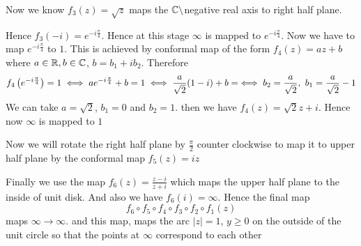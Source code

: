 \documentclass[a4paper, 11pt]{article}
\begin{document}
{\begin{center}
\end{center}
Now we know $f_3(z)=\sqrt{z}$ maps the $\mathbb{C}\setminus$negative real axis to right half plane.
\begin{center}
\end{center}
Hence $f_3(-i)=e^{-i\frac{\pi}{4}}$. Hence at this stage $\infty $ is mapped to $e^{-i\frac{\pi}{4}}$. Now we have to map $e^{-i\frac{\pi}{4}}$ to $1$. This is achieved by conformal map of the form $f_4(z)=az+b$ where $a\in\mathbb{R},b\in\mathbb{C}$, $b=b_1+ib_2$. Therefore $$f_4\left(e^{-i\frac{\pi}{4}}\right)=1\iff ae^{-i\frac{\pi}{4}}+b=1\iff \frac{a}{\sqrt{2}}(1-i)+b=\iff b_2=\frac{a}{\sqrt{2}},\ b_1=\frac{a}{\sqrt{2}}-1$$
We can take $a=\sqrt{2}$, $b_1=0$ and $b_2=1$. then we have $f_4(z)=\sqrt{2}z+i$. Hence now $\infty$ is mapped to $1$

Now we will rotate the right half plane by $\frac{\pi}{2}$ counter clockwise to map it to upper half plane by the conformal map $f_5(z)=iz$
\begin{center}
\end{center}

Finally we use the map $f_6(z)=\frac{z-i}{z+i}$ which maps the upper half plane to the inside of unit disk. And also we have $f_6(i)=\infty$. Hence the final map $$f_6\circ f_5\circ f_4\circ f_3\circ f_2\circ f_1(z)$$ maps $\infty\to\infty$. and this map, maps the arc $|z|=1$, $y\geq 0$ on the outside of the unit circle so that the points at  $\infty$ correspond to each other

}
\end{document}
